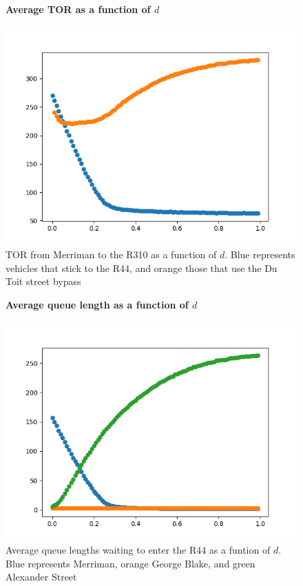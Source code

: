 \documentclass{article}
\begin{document}
\begin{figure}
\textbf{\large Average TOR as a function of $d$}\par\medskip
{}
\includegraphics[scale = 0.55, left]{./data/phase4/TORs_vs_d.png}
\vspace*{0.1cm}\hspace*{4.5cm}{\large $d$}
\caption{\label{fig} TOR from Merriman to the R310 as a function of $d$. Blue represents vehicles that stick to the R44, and orange those that use the Du Toit street bypass}
\end{figure}

\begin{figure}
\textbf{\large Average queue length as a function of $d$}\par\medskip
{}
\includegraphics[scale = 0.55, left]{./data/phase4/queues_vs_d.png}
\vspace*{0.1cm}\hspace*{4.5cm}{\large $d$}
\caption{\label{fig} Average queue lengths waiting to enter the R44 as a funtion of $d$. Blue represents Merriman, orange George Blake, and green Alexander Street}
\end{figure}
\end{document}
